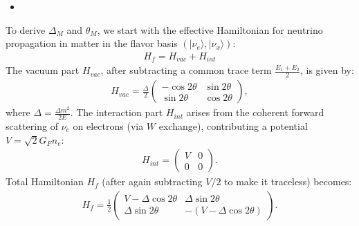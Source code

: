 \begin{itemize}
    \item [(b)]
\end{itemize}
To derive $\Delta_M$ and $\theta_M$, we start with the effective Hamiltonian for neutrino propagation in matter in the flavor basis $(|\nu_e\rangle, |\nu_x\rangle)$:
\begin{align}
H_{f} = H_{vac} + H_{int}
\end{align}
The vacuum part $H_{vac}$, after subtracting a common trace term $\frac{E_1+E_2}{2}$, is given by:
\begin{align}
H_{vac} = \frac{\Delta}{2} 
    \begin{pmatrix} 
    -\cos 2\theta & \sin 2\theta \\
     \sin 2\theta & \cos 2\theta 
    \end{pmatrix},
\end{align}
where $\Delta = \frac{\Delta m^2}{2E}$. The interaction part $H_{int}$ arises from the coherent forward scattering of $\nu_e$ on electrons (via $W$ exchange), contributing a potential $V = \sqrt{2}G_F n_e$:
\begin{align}
H_{int} = \begin{pmatrix} 
    V & 0 \\ 
    0 & 0 \end{pmatrix}.
\end{align}
Total Hamiltonian $H_f$ (after again subtracting $V/2$ to make it traceless) becomes:
\begin{align}
H_f = \frac{1}{2} 
    \begin{pmatrix} 
    V - \Delta \cos 2\theta & \Delta \sin 2\theta \\
     \Delta \sin 2\theta & -(V - \Delta \cos 2\theta) 
    \end{pmatrix}.
\end{align}

